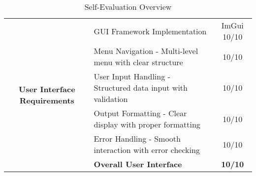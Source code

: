 \begin{center}
\begin{table}[H]
\begin{tabularx}{\textwidth}{| c | X | c |}
			\multirow{6}{*}{\parbox{4cm}{\centering\textbf{User Interface Requirements}}}
			               & GUI Framework Implementation                                                       & ImGui 10/10       \\
			\cline{2-3}
			               & Menu Navigation - Multi-level menu with clear structure                            & 10/10             \\
			\cline{2-3}
			               & User Input Handling - Structured data input with validation                        & 10/10             \\
			\cline{2-3}
			               & Output Formatting - Clear display with proper formatting                           & 10/10             \\
			\cline{2-3}
			               & Error Handling - Smooth interaction with error checking                            & 10/10             \\
			\cline{2-3}
			               & \textbf{Overall User Interface}                                                             & \textbf{10/10}             \\
			\hline
		\end{tabularx}
		\caption{Self-Evaluation Overview}
	\end{table}
\end{center}

